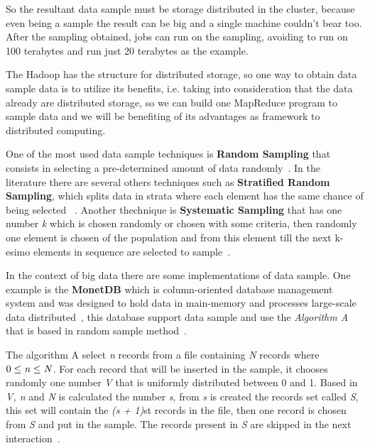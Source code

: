 So the resultant data sample must be storage distributed in the cluster, because
even being a sample the result can be big and a single machine couldn't bear too.
After the sampling obtained, jobs can run on the sampling, avoiding to run on 100
terabytes and run just 20 terabytes as the example.


The Hadoop has the structure for distributed storage, so one way to obtain data
sample data is to utilize its benefits, i.e. taking into consideration that the
data already are distributed storage, so we can build one MapReduce program to
sample data and we will be benefiting of its advantages as framework to distributed
computing.

One of the most used data sample techniques is {\bf Random Sampling} that consists
in selecting a pre-determined amount of data randomly~\cite{randomsampling}.
In the literature there are several others techniques such as {\bf Stratified Random Sampling},
which splits data in strata where each element has the same chance of being selected
~\cite{randomsampling}. Another thechnique is {\bf Systematic Sampling} that has
one number {\it k} which is chosen randomly or chosen with some criteria, then
randomly one element is chosen of the population and from this element till the
next k-esimo elements in sequence are selected to sample~\cite{systematicsampling}.

In the context of big data there are some implementations of data sample. One example
is the {\bf MonetDB} which is column-oriented database management system and was
designed to hold data in main-memory and processes large-scale data distributed~\cite{monetDB},
this database support data sample and use the {\it Algorithm A} that is based in
random sample method~\cite{monetDB:sampling}.

The algorithm A select {\it n} records from a file containing {\it N} records where
$0\le{\it n}\le{\it N}$. For each record that will be inserted in the sample,
it chooses randomly one number {\it V} that is uniformly distributed between 0 and 1.
Based in {\it V, n} and {\it N} is calculated the number {\it s}, from {\it s}
is created the records set called {\it S}, this set will contain the {\it (s + 1)}st
records in the file, then one record is chosen from {\it S} and put in the sample.
The records present in {\it S} are skipped in the next interaction~\cite{vitter:1984}.

